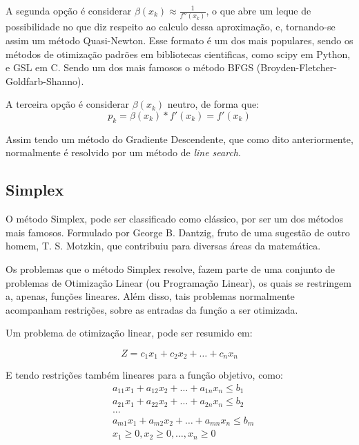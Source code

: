 A segunda opção é considerar \(\beta(x_k) \approx \frac{1}{f''(x_k)}\), o que
abre um leque de possibilidade no que diz respeito ao calculo dessa aproximação,
e, tornando-se assim um método Quasi-Newton. Esse formato é um dos mais
populares, sendo os métodos de otimização padrões em bibliotecas cientificas,
como scipy em Python, e GSL em C. Sendo um dos mais famosos o método BFGS
(Broyden-Fletcher-Goldfarb-Shanno).


A terceira opção é considerar \(\beta(x_k) \) neutro, de forma que:
\begin{equation}
    p_k = \beta(x_k) * f'(x_k) = f'(x_k)
\end{equation}

Assim tendo um método do Gradiente Descendente, que como dito anteriormente,
normalmente é resolvido por um método de \textit{line search}.






\subsection{Simplex}

\hspace{0.8cm}
O método Simplex, pode ser classificado como clássico, por ser um
dos métodos mais famosos. Formulado por George B. Dantzig, fruto de uma
sugestão de outro homem, T. S. Motzkin, que contribuiu para diversas áreas da
matemática.

Os problemas que o método Simplex resolve, fazem parte de uma conjunto de
problemas de Otimização Linear (ou Programação Linear), os quais se restringem
a, apenas, funções lineares. Além disso, tais problemas normalmente acompanham
restrições, sobre as entradas da função a ser otimizada.

Um problema de otimização linear, pode ser resumido em:

\begin{equation}
        Z = c_1x_1 + c_2x_2 + … + c_nx_n
\end{equation}

E tendo restrições também lineares para a função objetivo, como:
\begin{equation}
    \begin{split}
        &   a_{11}x_1 + a_{12}x_2 + … + a_{1n}x_n \leq b_1\\
        &   a_{21}x_1 + a_{22}x_2 + … + a_{2n}x_n \leq b_2\\
        &   ...\\
        &   a_{m1}x_1 + a_{m2}x_2 + … + a_{mn}x_n \leq b_m\\
        &   x_1 \geq 0, x_2 \geq 0, …, x_n \geq 0
    \end{split}
\end{equation}

